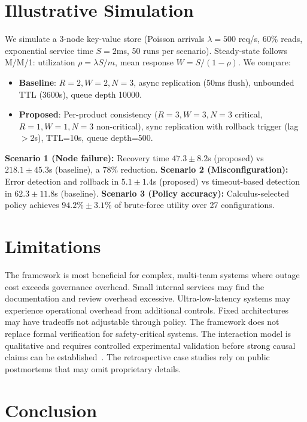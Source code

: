\documentclass[conference]{IEEEtran}
\begin{document}
{\section{Illustrative Simulation}
\label{sec:eval}

We simulate a 3-node key-value store (Poisson arrivals $\lambda=500$ req/s, 60\% reads, exponential service time $S=2$ms, 50 runs per scenario). Steady-state follows M/M/1: utilization $\rho = \lambda S / m$, mean response $W = S/(1-\rho)$. We compare:
\begin{itemize}
    \item \textbf{Baseline}: $R=2, W=2, N=3$, async replication (50ms flush), unbounded TTL (3600s), queue depth 10000.
    \item \textbf{Proposed}: Per-product consistency ($R=3,W=3,N=3$ critical, $R=1,W=1,N=3$ non-critical), sync replication with rollback trigger (lag $>2$s), TTL=10s, queue depth=500.
\end{itemize}
\textbf{Scenario 1 (Node failure):} Recovery time $47.3 \pm 8.2$s (proposed) vs $218.1 \pm 45.3$s (baseline), a 78\% reduction.
\textbf{Scenario 2 (Misconfiguration):} Error detection and rollback in $5.1 \pm 1.4$s (proposed) vs timeout-based detection in $62.3 \pm 11.8$s (baseline).
\textbf{Scenario 3 (Policy accuracy):} Calculus-selected policy achieves $94.2\% \pm 3.1\%$ of brute-force utility over 27 configurations.

\section{Limitations}

The framework is most beneficial for complex, multi-team systems where outage cost exceeds governance overhead. Small internal services may find the documentation and review overhead excessive. Ultra-low-latency systems may experience operational overhead from additional controls. Fixed architectures may have tradeoffs not adjustable through policy. The framework does not replace formal verification for safety-critical systems. The interaction model is qualitative and requires controlled experimental validation before strong causal claims can be established~\cite{gherghe2025framework}. The retrospective case studies rely on public postmortems that may omit proprietary details.

\section{Conclusion}

}
\end{document}
